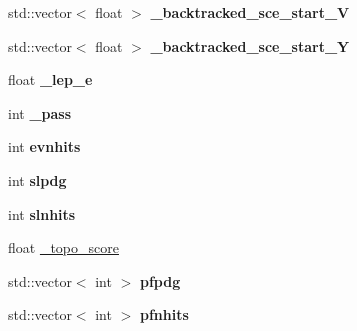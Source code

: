 \begin{DoxyCompactItemize}
\item 
std\+::vector$<$ float $>$ {\bfseries \+\_\+backtracked\+\_\+sce\+\_\+start\+\_\+V}\hypertarget{classanalysis_1_1DefaultAnalysis_a60a91d117c7af7c232740f0b7292cbfc}{}\label{classanalysis_1_1DefaultAnalysis_a60a91d117c7af7c232740f0b7292cbfc}

\item 
std\+::vector$<$ float $>$ {\bfseries \+\_\+backtracked\+\_\+sce\+\_\+start\+\_\+Y}\hypertarget{classanalysis_1_1DefaultAnalysis_a519529d1530781d609bd26587d74fca3}{}\label{classanalysis_1_1DefaultAnalysis_a519529d1530781d609bd26587d74fca3}

\item 
float {\bfseries \+\_\+lep\+\_\+e}\hypertarget{classanalysis_1_1DefaultAnalysis_ab00e533228597e83340a23d04b986086}{}\label{classanalysis_1_1DefaultAnalysis_ab00e533228597e83340a23d04b986086}

\item 
int {\bfseries \+\_\+pass}\hypertarget{classanalysis_1_1DefaultAnalysis_a8d58d05d4b0750a67babff41beece3ac}{}\label{classanalysis_1_1DefaultAnalysis_a8d58d05d4b0750a67babff41beece3ac}

\item 
int {\bfseries evnhits}\hypertarget{classanalysis_1_1DefaultAnalysis_a32911aea589477a3832a4de8d134696d}{}\label{classanalysis_1_1DefaultAnalysis_a32911aea589477a3832a4de8d134696d}

\item 
int {\bfseries slpdg}\hypertarget{classanalysis_1_1DefaultAnalysis_a9763429d7ed32c67e96d981d14893c06}{}\label{classanalysis_1_1DefaultAnalysis_a9763429d7ed32c67e96d981d14893c06}

\item 
int {\bfseries slnhits}\hypertarget{classanalysis_1_1DefaultAnalysis_a9f003b22425d9db3b27eabee64700028}{}\label{classanalysis_1_1DefaultAnalysis_a9f003b22425d9db3b27eabee64700028}

\item 
float \hyperlink{classanalysis_1_1DefaultAnalysis_a950efb6f4e8f1ad6dd00e24bc74002c2}{\+\_\+topo\+\_\+score}
\item 
std\+::vector$<$ int $>$ {\bfseries pfpdg}\hypertarget{classanalysis_1_1DefaultAnalysis_a5d3ad6cd0930367cafe48e485aa19d20}{}\label{classanalysis_1_1DefaultAnalysis_a5d3ad6cd0930367cafe48e485aa19d20}

\item 
std\+::vector$<$ int $>$ {\bfseries pfnhits}\hypertarget{classanalysis_1_1DefaultAnalysis_a8d010c569e35c153059a6db573b9542d}{}\label{classanalysis_1_1DefaultAnalysis_a8d010c569e35c153059a6db573b9542d}


\end{DoxyCompactItemize}
